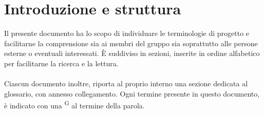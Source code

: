 \documentclass[5pt]{article}
\begin{document}
\pagebreak
\tableofcontents
\pagebreak

\section*{Introduzione e struttura}
Il presente documento ha lo scopo di individuare le terminologie di progetto e facilitarne la comprensione sia ai membri del gruppo sia soprattutto alle persone esterne o eventuali interessati. È suddiviso in sezioni, inserite in ordine alfabetico per facilitarne la ricerca e la lettura.\\ \\
Ciascun documento inoltre, riporta al proprio interno una sezione dedicata al glossario, con annesso collegamento. Ogni termine presente in questo documento, è indicato con una \textsuperscript{G} al termine della parola.
\pagebreak
\end{document}
